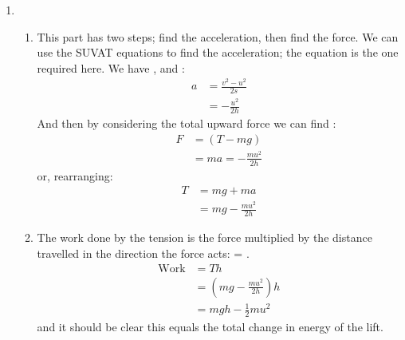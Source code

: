 \begin{problem}[HE+_Lift]
{\begin{enumerate}
\begin{enumerate}
\begin{align*}
&= mg + \frac{mu^{2}}{2h} 
\end{align*}
	\item The work done by the tension is the force multiplied by the distance travelled in the direction the force acts:  =  (as the tension acts in the opposite direction to the distance).
	\begin{align*} 
	\textrm{Work} &= -Th \\
	&= -\left(mg + \frac{mu^{2}}{2h}\right)h \\ 
	&= - mgh - \frac{1}{2}mu^{2} 
	\end{align*}
and it should be clear this equals the total change in energy of the lift.
\end{enumerate}
\item 
\begin{enumerate} 
\item This part has two steps; find the acceleration, then find the force. We can use the SUVAT equations to find the acceleration; the equation  is the one required here. We have ,  and :
\begin{align*} 
a &= \frac{v^{2} - u^{2}}{2s} \\ 
&= -\frac{u^{2}}{2h} 
\end{align*}
And then by considering the total upward force we can find :
\begin{align*} 
F &= (T - mg) \\ 
&= ma = -\frac{mu^{2}}{2h} 
\end{align*}
or, rearranging:
\begin{align*} 
T &= mg + ma \\ 
&= mg - \frac{mu^{2}}{2h} 
\end{align*}
	\item The work done by the tension is the force multiplied by the distance travelled in the direction the force acts:  = .
	\begin{align*} 
	\text{Work} &= Th \\
	&= \left(mg - \frac{mu^{2}}{2h}\right)h \\ 
	&= mgh - \frac{1}{2}mu^{2} 
	\end{align*}
and it should be clear this equals the total change in energy of the lift. 
\end{enumerate}
\end{enumerate}}
\end{problem}